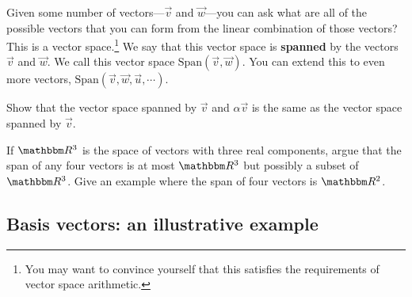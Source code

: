 \documentclass[12pt]{article}
\begin{document}
Given some number of vectors---$\vec{v}$ and $\vec{w}$---you can ask what are all of the possible vectors that you can form from the linear combination of those vectors? This is a vector space.\footnote{You may want to convince yourself that this satisfies the requirements of vector space arithmetic.} We say that this vector space is \textbf{spanned} by the vectors $\vec{v}$ and $\vec{w}$. We call this vector space $\text{Span}(\vec{v},\vec{w})$. You can extend this to even more vectors, $\text{Span}(\vec{v}, \vec{w}, \vec{u},\cdots)$.

\begin{exercise}
Show that the vector space spanned by $\vec{v}$ and $\alpha\vec{v}$ is the same as the vector space spanned by $\vec{v}$.
\end{exercise}

\begin{exercise}
If $\RR ^3$ is the space of vectors with three real components, argue that the span of any four vectors is at most $\RR ^3$ but possibly a subset of $\RR ^3$. Give an example where the span of four vectors is $\RR ^2$. 
\end{exercise}

\subsection{Basis vectors: an illustrative example}
\end{document}
